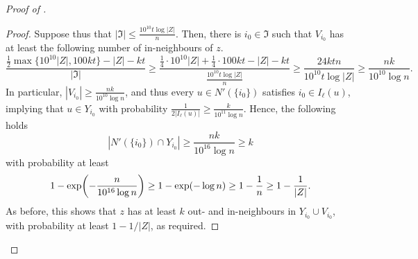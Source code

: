 \documentclass[english]{article}
\theoremstyle{plain}
\theoremstyle{remark}
\let\originalleft\left
\let\originalright\right
\renewcommand{\left}{\mathopen{}\mathclose\bgroup\originalleft}
\renewcommand{\right}{\aftergroup\egroup\originalright}
\begin{document}
\begin{proof}[Proof of ]
\begin{proof}
			Suppose thus that $|\Im| \le \frac{10^{10} t \log |Z|}{n}$.
			Then, there is $i_0 \in \Im$ such that $V_{i_0}$ has at least the following number of in-neighbours of $z$.
			\begin{equation*}
				\frac{\frac{1}{2}\max\{10^{10}|Z|,100kt\} - |Z| - kt}{|\Im|}
				\ge \frac{\frac{1}{4} \cdot 10^{10}|Z| + \frac{1}{4} \cdot 100kt - |Z| - kt}{\frac{10^{10} t \log |Z|}{n}}
				\ge \frac{24 ktn}{10^{10}t \log |Z|}
				\ge \frac{nk}{10^{10} \log n}.
			\end{equation*}
			In particular, $|V_{i_0}| \ge \frac{nk}{10^{10}\log n}$, and thus every $u \in N'(\{i_0\})$ satisfies $i_0 \in I_{\ell}(u)$, implying that $u \in Y_{i_0}$ with probability $\frac{1}{2|I_{\ell}(u)|} \ge \frac{k}{10^{11}\log n}$. Hence, the following holds
			\begin{equation*}
				|N'(\{i_0\}) \cap Y_{i_0}| 
				\ge \frac{nk}{10^{16} \log n} \ge k
			\end{equation*}
			with probability at least
			\begin{equation*}
				1 - \exp\left(-\frac{n}{10^{16} \log n}\right)
				\ge 1 - \exp(-\log n)
				\ge 1 - \frac{1}{n} 
				\ge 1 - \frac{1}{|Z|}.
			\end{equation*}
			As before, this shows that $z$ has at least $k$ out- and in-neighbours in $Y_{i_0} \cup V_{i_0}$, with probability at least $1 - 1/|Z|$, as required.
		\end{proof}


\end{proof}
\end{document}
